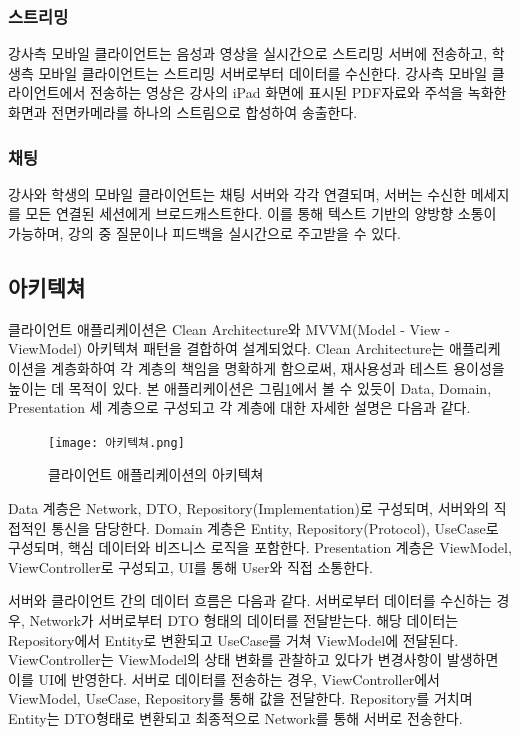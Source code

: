 \documentclass[10pt, a4paper, oneside]{article}
\begin{document}
\subsubsection{스트리밍}
강사측 모바일 클라이언트는 음성과 영상을 실시간으로 스트리밍 서버에 전송하고, 학생측 모바일 클라이언트는 스트리밍 서버로부터 데이터를 수신한다. 강사측 모바일 클라이언트에서 전송하는 영상은 강사의 iPad 화면에 표시된 PDF자료와 주석을 녹화한 화면과 전면카메라를 하나의 스트림으로 합성하여 송출한다.
\subsubsection{채팅}
강사와 학생의 모바일 클라이언트는 채팅 서버와 각각 연결되며, 서버는 수신한 메세지를 모든 연결된 세션에게 브로드캐스트한다. 이를 통해 텍스트 기반의 양방향 소통이 가능하며, 강의 중 질문이나 피드백을 실시간으로 주고받을 수 있다.
\subsection{아키텍쳐}
클라이언트 애플리케이션은 Clean Architecture와 MVVM(Model - View - ViewModel) 아키텍쳐 패턴을 결합하여 설계되었다. Clean Architecture는 애플리케이션을 계층화하여 각 계층의 책임을 명확하게 함으로써, 재사용성과 테스트 용이성을 높이는 데 목적이 있다. 본 애플리케이션은 그림\ref{fig:fig2}에서 볼 수 있듯이 Data, Domain, Presentation 세 계층으로 구성되고 각 계층에 대한 자세한 설명은 다음과 같다.
\begin{figure}[htbp]
    \begin{center}
    \texttt{[image: 아키텍쳐.png]}
    \caption{클라이언트 애플리케이션의 아키텍쳐}
    \label{fig:fig2}
    \end{center}
\end{figure}

Data 계층은 Network, DTO, Repository(Implementation)로 구성되며, 서버와의 직접적인 통신을 담당한다. Domain 계층은 Entity, Repository(Protocol), UseCase로 구성되며, 핵심 데이터와 비즈니스 로직을 포함한다. Presentation 계층은 ViewModel, ViewController로 구성되고, UI를 통해 User와 직접 소통한다.

서버와 클라이언트 간의 데이터 흐름은 다음과 같다.
서버로부터 데이터를 수신하는 경우, Network가 서버로부터 DTO 형태의 데이터를 전달받는다. 해당 데이터는 Repository에서 Entity로 변환되고 UseCase를 거쳐 ViewModel에 전달된다. ViewController는 ViewModel의 상태 변화를 관찰하고 있다가 변경사항이 발생하면 이를 UI에 반영한다.
서버로 데이터를 전송하는 경우, ViewController에서 ViewModel, UseCase, Repository를 통해 값을 전달한다. Repository를 거치며 Entity는 DTO형태로 변환되고 최종적으로 Network를 통해 서버로 전송한다.
\end{document}
